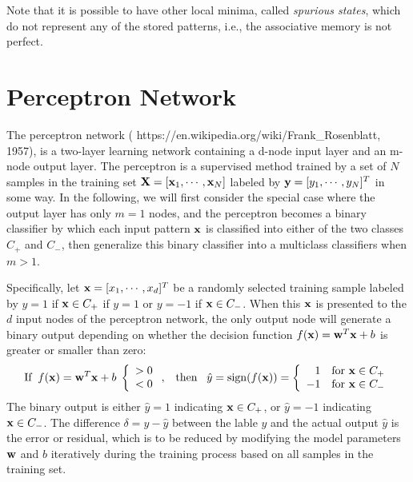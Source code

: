 \documentclass{article}
\DeclareMathOperator{\sign}{sign}
\begin{document}
Note that it is possible to have other local minima, called {\em spurious 
states}, which do not represent any of the stored patterns, i.e., the 
associative memory is not perfect.


\section{Perceptron Network}

The perceptron network (
{https://en.wikipedia.org/wiki/Frank_Rosenblatt}, 1957), is a
two-layer learning network containing a d-node input layer and an
m-node output layer. The perceptron is a supervised method trained 
by a set of $N$ samples in the training set 
${\bf X}=[{\bf x}_1,\cdots,{\bf x}_N]$ labeled by 
${\bf y}=[y_1,\cdots,y_N]^T$ in some way. In the following, we will 
first consider the special case where the output layer has only $m=1$
nodes, and the perceptron becomes a binary classifier by which each
input pattern ${\bf x}$ is classified into either of the two classes
$C_+$ and $C_-$, then generalize this binary classifier into a
multiclass classifiers when $m>1$. 

Specifically, let ${\bf x}=[x_1,\cdots,x_d]^T$ be a randomly selected
training sample labeled by $y=1$ if ${\bf x}\in C_+$ if $y=1$ or 
$y=-1$ if ${\bf x}\in C_-$. When this ${\bf x}$ is presented to the
$d$ input nodes of the perceptron network, the only output node will
generate a binary output depending on whether the decision function 
$f({\bf x})={\bf w}^T{\bf x}+b$ is greater or smaller than zero:
\begin{equation}
  \mbox{If} \;\; f({\bf x})={\bf w}^T{\bf x}+b \; 
  \left\{ \begin{array}{l} > 0\\ <0 \end{array} \right.,
  \;\;\;\mbox{then}\;\;\;
  \hat{y}=\sign(f({\bf x}))
  =\left\{ \begin{array}{rl} 1 & \mbox{for } {\bf x}\in C_+\\
    -1 & \mbox{for } {\bf x}\in C_-\end{array} \right.
\end{equation}
The binary output is either $\hat{y}=1$ indicating ${\bf x}\in C_+$, 
or $\hat{y}=-1$ indicating ${\bf x}\in C_-$. The difference 
$\delta=y-\hat{y}$ between the lable $y$ and the actual output $\hat{y}$ 
is the error or residual, which is to be reduced by modifying the model 
parameters ${\bf w}$ and $b$ iteratively during the training process based 
on all samples in the training set.
\end{document}
